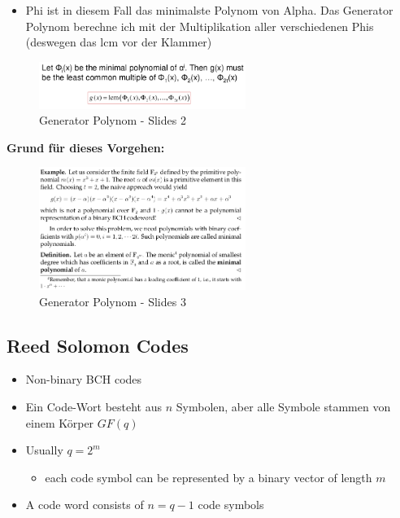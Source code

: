 \begin{itemize}
\tightlist
\item
  Phi ist in diesem Fall das minimalste Polynom von Alpha. Das Generator Polynom
  berechne ich mit der Multiplikation aller verschiedenen Phis (deswegen
  das lcm vor der Klammer)
\end{itemize}

\begin{figure}[H]
\centering
\includegraphics[width=0.6\textwidth]{figures/generatorPolynomial3.png}
\caption{Generator Polynom - Slides 2}
\end{figure}

\clearpage

\textbf{Grund für dieses Vorgehen:}

\begin{figure}[H]
\centering
\includegraphics[width=0.6\textwidth]{figures/generatorPolynomial.png}
\caption{Generator Polynom - Slides 3}
\end{figure}

\hypertarget{reed-solomon-codes}{%
\subsection{Reed Solomon Codes}\label{reed-solomon-codes}}

\begin{itemize}
\tightlist
\item
  Non-binary BCH codes
\item
  Ein Code-Wort besteht aus $n$ Symbolen, aber alle Symbole stammen von
  einem Körper $GF(q)$
\item
  Usually $q = 2^m$

  \begin{itemize}
  \tightlist
  \item
    each code symbol can be represented by a binary vector of length $m$
  \end{itemize}
\item
  A code word consists of $n = q - 1$ code symbols
\end{itemize}

